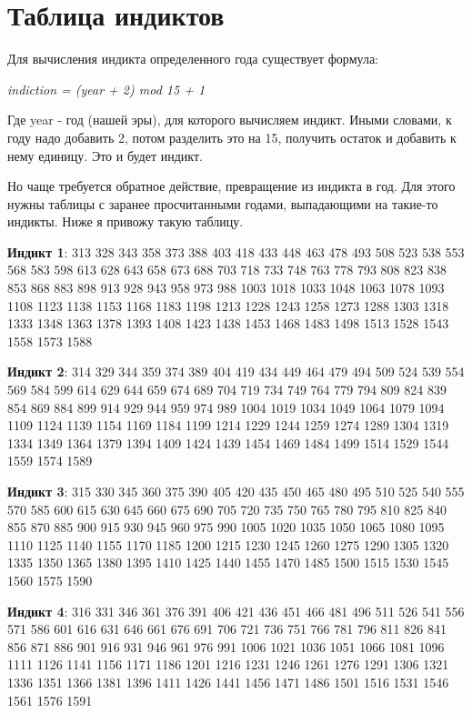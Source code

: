 \chapter*{Таблица индиктов}

Для вычисления индикта определенного года существует формула:

\textit{indiction = (year + 2) mod 15 + 1 }

Где year - год (нашей эры), для которого вычисляем индикт. Иными словами, к году надо добавить 2, потом разделить это на 15, получить остаток и добавить к нему единицу. Это и будет индикт.

Но чаще требуется обратное действие, превращение из индикта в год. Для этого нужны таблицы с заранее просчитанными годами, выпадающими на такие-то индикты. Ниже я привожу такую таблицу.

\textbf{Индикт 1}: 313 328 343 358 373 388 403 418 433 448 463 478 493 508 523 538 553 568 583 598 613 628 643 658 673 688 703 718 733 748 763 778 793 808 823 838 853 868 883 898 913 928 943 958 973 988 1003 1018 1033 1048 1063 1078 1093 1108 1123 1138 1153 1168 1183 1198 1213 1228 1243 1258 1273 1288 1303 1318 1333 1348 1363 1378 1393 1408 1423 1438 1453 1468 1483 1498 1513 1528 1543 1558 1573 1588

 \textbf{Индикт 2}: 314 329 344 359 374 389 404 419 434 449 464 479 494 509 524 539 554 569 584 599 614 629 644 659 674 689 704 719 734 749 764 779 794 809 824 839 854 869 884 899 914 929 944 959 974 989 1004 1019 1034 1049 1064 1079 1094 1109 1124 1139 1154 1169 1184 1199 1214 1229 1244 1259 1274 1289 1304 1319 1334 1349 1364 1379 1394 1409 1424 1439 1454 1469 1484 1499 1514 1529 1544 1559 1574 1589 

\textbf{Индикт 3}: 315 330 345 360 375 390 405 420 435 450 465 480 495 510 525 540 555 570 585 600 615 630 645 660 675 690 705 720 735 750 765 780 795 810 825 840 855 870 885 900 915 930 945 960 975 990 1005 1020 1035 1050 1065 1080 1095 1110 1125 1140 1155 1170 1185 1200 1215 1230 1245 1260 1275 1290 1305 1320 1335 1350 1365 1380 1395 1410 1425 1440 1455 1470 1485 1500 1515 1530 1545 1560 1575 1590

\textbf{Индикт 4}: 316 331 346 361 376 391 406 421 436 451 466 481 496 511 526 541 556 571 586 601 616 631 646 661 676 691 706 721 736 751 766 781 796 811 826 841 856 871 886 901 916 931 946 961 976 991 1006 1021 1036 1051 1066 1081 1096 1111 1126 1141 1156 1171 1186 1201 1216 1231 1246 1261 1276 1291 1306 1321 1336 1351 1366 1381 1396 1411 1426 1441 1456 1471 1486 1501 1516 1531 1546 1561 1576 1591

